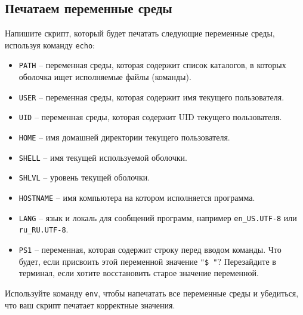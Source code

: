 \documentclass{article}
\begin{document}
\subsection{Печатаем переменные среды}
Напишите скрипт, который будет печатать следующие переменные среды, используя команду \texttt{echo}:
\begin{itemize}
\item \texttt{PATH} -- переменная среды, которая содержит список каталогов, в которых оболочка ищет исполняемые файлы (команды).
\item \texttt{USER} -- переменная среды, которая содержит имя текущего пользователя.
\item \texttt{UID} -- переменная среды, которая содержит UID текущего пользователя.
\item \texttt{HOME} -- имя домашней директории текущего пользователя.
\item \texttt{SHELL} -- имя текущей используемой оболочки.
\item \texttt{SHLVL} -- уровень текущей оболочки.
\item \texttt{HOSTNAME} -- имя компьютера на котором исполняется программа.
\item \texttt{LANG} -- язык и локаль для сообщений программ, например \texttt{en\_US.UTF-8} или \texttt{ru\_RU.UTF-8}.
\item \texttt{PS1} -- переменная, которая содержит строку перед вводом команды. Что будет, если присвоить этой переменной значение \texttt{"\$ "}? Перезайдите в терминал, если хотите восстановить старое значение переменной.
\end{itemize}
Используйте команду \texttt{env}, чтобы напечатать все переменные среды и убедиться, что ваш скрипт печатает корректные значения.
\end{document}
